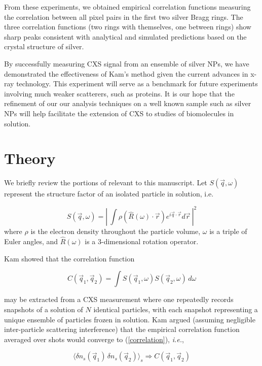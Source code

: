 \documentclass [11pt,fleqn]{article}
\def \be {\begin{equation}}
\def \ee {\end{equation}}
\begin{document}
From these experiments, we obtained empirical correlation functions measuring the correlation between all pixel pairs in the first two silver Bragg rings. The three correlation functions (two rings with themselves, one between rings) show sharp peaks consistent with analytical and simulated predictions based on the crystal structure of silver.

By successfully measuring CXS signal from an ensemble of silver NPs, we have demonstrated the effectiveness of Kam's method given the current advances in x-ray technology. This experiment will serve as a benchmark for future experiments involving much weaker scatterers, such as proteins. It is our hope that the refinement of our our analysis techniques on a well known sample such as silver NPs will help facilitate the extension of CXS to studies of biomolecules in solution.

\section{Theory}

We briefly review the portions of \cite{Kam:1977wc} relevant to this manuscript. Let $S( \vec{q},\omega)$ represent the structure factor of an isolated particle in solution, i.e.

\be \label{structurefactor}
S(\vec{q},\omega) = \left| \> \int \rho \left(\hat{R} (\omega)\cdot \vec{r} \right) e^ { i \vec{q} \cdot \vec{r} } d\vec{r} \> \right| ^{2}
\ee
where $\rho $ is the electron density throughout the particle volume, $\omega$ is a triple of Euler angles, and $\hat{R}(\omega)$ is a 3-dimensional rotation operator.

Kam showed that the correlation function

\be \label{correlation}
C(\vec{q}_1, \vec{q}_2) = \int S( \vec{q}_{1},\omega ) S( \vec{q}_{2},\omega ) \, d \omega %
\ee

may be extracted from a CXS measurement where one repeatedly records snapshots of a solution of $N$ identical particles, with each snapshot representing a unique ensemble of particles frozen in solution. Kam argued (assuming negligible inter-particle scattering interference) that the empirical correlation function averaged over shots would converge to (\ref{correlation}), \textit{i.e.},

\be \label{converge}
\langle \delta n_{s}(\vec{q}_1) \, \delta n_{s}(\vec{q}_2) \rangle_{s} \Rightarrow C(\vec{q}_1, \vec{q}_2) 
\ee
\end{document}
